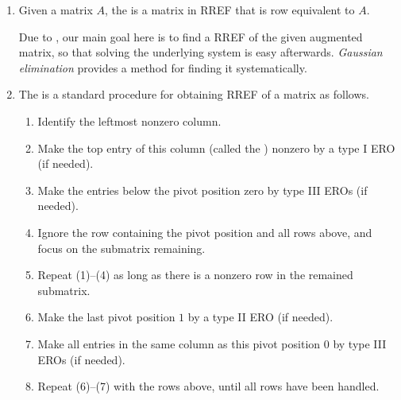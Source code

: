 \begin{enumerate}
\item Given a matrix \(A\), the  is a matrix in RREF that
is row equivalent to \(A\).

Due to , our main goal here is to find a RREF of
the given augmented matrix, so that solving the underlying system is easy
afterwards. \emph{Gaussian elimination} provides a method for finding it
systematically.

\item The  is a standard procedure for obtaining
RREF of a matrix as follows.
\begin{enumerate}[label=(\arabic*)]
\item Identify the leftmost nonzero column.
\item Make the top entry of this column (called the )
nonzero by a type I ERO (if needed).
\item Make the entries below the pivot position zero by type III EROs (if
needed).
\item Ignore the row containing the pivot position and all rows above, and
focus on the submatrix remaining.
\item Repeat (1)--(4) as long as there is a nonzero row in the remained
submatrix.
\item Make the last pivot position \(1\) by a type II ERO (if needed).
\item Make all entries in the same column as this pivot position \(0\) by type
III EROs (if needed).
\item Repeat (6)--(7) with the rows above, until all rows have been handled.
\end{enumerate}


\end{enumerate}

